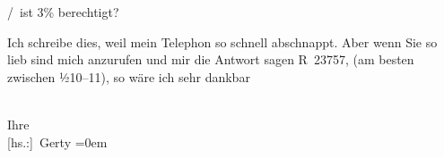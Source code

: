 / ist 3{\%} berechtigt?\pend
           
\pstart
           Ich schreibe dies, weil mein Telephon so schnell abschnappt. Aber wenn Sie so lieb
               sind mich anzurufen und mir die Antwort sagen R 23757, (am besten zwischen
                  ½10–11), so wäre ich sehr dankbar\pend
           
\pstart
           \label{T_L02525-2v}\label{T_L02525-2}{\\[\baselineskip]}Ihre{\\[\baselineskip]}\spacefill\mbox{{[}hs.:{]} Gerty}\pend
           \leftskip=0em{}\endnumbering{}  
      
